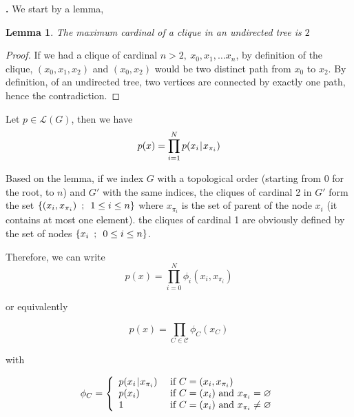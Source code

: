 \documentclass[a4paper, 11pt]{article}
\newtheorem{lemma}{Lemma}[section]
\newcounter{cquestion}[subsection]
\renewcommand{\thecquestion}{\arabic{cquestion}}
\newenvironment{question}
{\par \vspace{0.5em} \noindent \stepcounter{cquestion} \hspace{-1em}
 \textbf{\thecquestion.}}
{}
\newcommand{\set}[2]{\left\{ #1 \hspace{.5em} ; \hspace{.5em}#2 \right\}}
\newcommand{\pcond}[2]{p(#1 \hspace{-.2em}\mid\hspace{-.2em} #2)}
\begin{document}
\begin{question}
  We start by a lemma,
  \begin{lemma}
    The maximum cardinal of a clique in an undirected tree is $2$
  \end{lemma}

  \begin{proof}
    If we had a clique of cardinal $n > 2,\ x_0, x_1, \dots x_n$, by
    definition of the clique, $(x_0, x_1, x_2)$ and $(x_0, x_2)$ would
    be two distinct path from $x_0$ to $x_2$. By definition, of an
    undirected tree, two vertices are connected by exactly one path,
    hence the contradiction.
  \end{proof}

  Let $p \in \mathcal{L}(G)$, then we have
  \begin{equation*}
    p(x) = \prod_{i = 1}^N \pcond{x_i}{x_{\pi_i}}
  \end{equation*}

  Based on the lemma, if we index $G$ with a topological order
  (starting from $0$ for the root, to $n$) and $G'$ with the same
  indices, the cliques of cardinal 2 in $G'$ form the set
  $\set{(x_i, x_{\pi_i})}{1 \le i \le n}$ where $x_{\pi_i}$ is the set
  of parent of the node $x_i$ (it contains at most one element). the
  cliques of cardinal 1 are obviously defined by the set of nodes
  $\set{x_i}{0 \le i \le n}$.

  Therefore, we can write
  \begin{equation*}
    p(x) = \prod_{i = 0}^N \phi_i(x_i, x_{\pi_i})
  \end{equation*}

  or equivalently

  \begin{equation*}
    p(x) = \prod_{C \in \mathcal{C}} \phi_C(x_C)
  \end{equation*}


  with

  \begin{equation*}
    \phi_C = \left\{
      \begin{array}{lll}
        \pcond{x_i}{x_{\pi_i}} &\text{ if } C = (x_i, x_{\pi_i}) \\
        p(x_i) &\text{ if } C = (x_i) \text{ and } x_{\pi_i} = \varnothing \\
        1 &\text{ if } C = (x_i) \text{ and } x_{\pi_i} \ne \varnothing \\
      \end{array}
    \right.
  \end{equation*}


\end{question}
\end{document}
